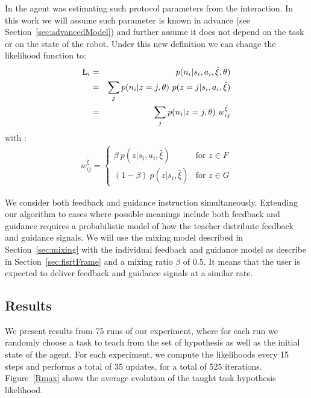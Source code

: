 In \cite{macl11simul} the agent was estimating such protocol parameters from the interaction. In this work we will assume such parameter is known in advance (see Section~\ref{sec:advancedModel}) and further assume it does not depend on the task or on the state of the robot. 
%
Under this new definition we can change the likelihood function to:
%
\begin{eqnarray}
\L_i &=&  p(n_i|s_i,a_i,\hat{\xi},\theta)\nonumber\\
                &=& \sum_{j} p(n_i|z = j,\theta)~p(z = j|s_i,a_i,\hat{\xi}) \nonumber\\
                &=& \sum_{j} p(n_i|z = j,\theta)~w_{ij}^{\hat{\xi}}
                \label{eq:likmix}
\end{eqnarray}
%
with :
%
\begin{eqnarray}
    w_{ij}^{\hat{\xi}} = 
        \begin{cases} 
            \beta~p(z|s_i,a_i,\hat{\xi}) &\mbox{for } z \in F \\
            (1- \beta)~p(z|s_i,\hat{\xi}) & \mbox{for } z \in G
        \end{cases} 
\end{eqnarray}

We consider both feedback and guidance instruction simultaneously. Extending our algorithm to cases where possible meanings include both feedback and guidance requires a probabilistic model of how the teacher distribute feedback and guidance signals. We will use the mixing model described in Section~\ref{sec:mixing} with the individual feedback and guidance model as describe in Section~\ref{sec:fisrtFrame} and a mixing ratio $\beta$ of 0.5. It means that the user is expected to deliver feedback and guidance signals at a similar rate.


\subsection{Results}

We present results from 75 runs of our experiment, where for each run we randomly choose a task to teach from the set of hypothesis as well as the initial state of the agent. For each experiment, we compute the likelihoods every 15 steps and performs a total of 35 updates, for a total of 525 iterations. Figure~\ref{Rmax} shows the average evolution of the taught task hypothesis likelihood.

